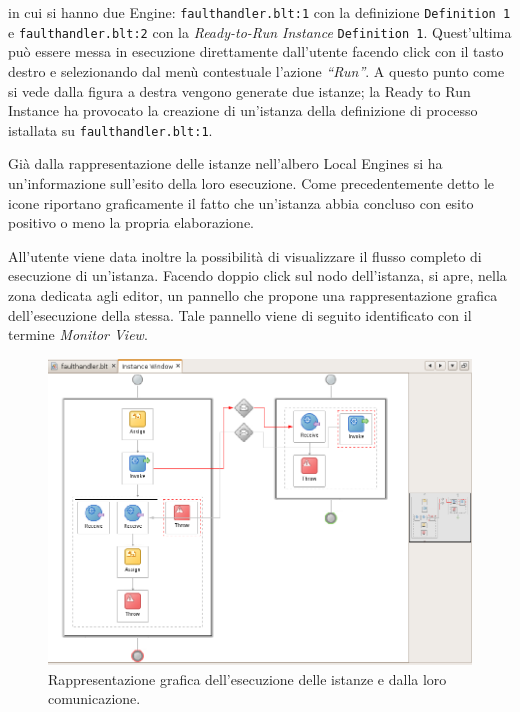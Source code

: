 \vspace{0.5cm}
in cui si hanno due Engine: \texttt{faulthandler.blt:1} con la definizione
\texttt{Definition 1} e \texttt{faulthandler.blt:2} con la \emph{Ready-to-Run
Instance} \texttt{Definition 1}. Quest'ultima può essere messa in esecuzione
direttamente dall'utente facendo click con il tasto destro e selezionando dal
menù contestuale l'azione \emph{``Run''}. A questo punto come si vede dalla
figura a destra vengono generate due istanze; la Ready to Run Instance ha
provocato la creazione di un'istanza della definizione di processo istallata su
\texttt{faulthandler.blt:1}.

Già dalla rappresentazione delle istanze nell'albero Local Engines si ha
un'informazione sull'esito della loro esecuzione. Come precedentemente detto
le icone riportano graficamente il fatto che un'istanza abbia concluso con
esito positivo o meno la propria elaborazione.

All'utente viene data inoltre la possibilità di visualizzare il flusso
completo di esecuzione di un'istanza. Facendo doppio click sul nodo
dell'istanza, si apre, nella zona dedicata agli editor, un pannello
che propone una rappresentazione grafica dell'esecuzione della stessa. Tale
pannello viene di seguito identificato con il termine \emph{Monitor View}.

\begin{figure}[p]
\begin{center}
\includegraphics[scale=0.65,angle=90]
{blide/dia/BlideMonitor1}
\caption[Blide: rappresentazione grafica di istanze]{Rappresentazione grafica
dell'esecuzione delle istanze e dalla loro comunicazione.}
  \label{fig:blideMonitor1}
\end{center}
\end{figure}

